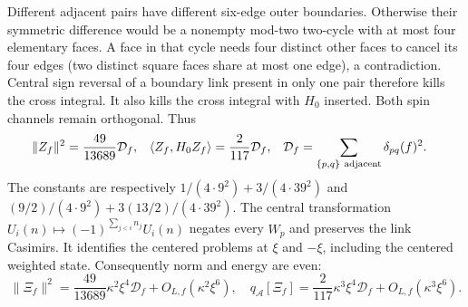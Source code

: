 \documentclass[11pt]{article}
\begin{document}
Different adjacent pairs have different six-edge outer boundaries.
Otherwise their symmetric difference would be a nonempty mod-two
two-cycle with at most four elementary faces. A face in that cycle
needs four distinct other faces to cancel its four edges (two distinct
square faces share at most one edge), a contradiction.
Central sign reversal of a boundary link present in only one pair
therefore kills the cross integral. It also kills the cross integral
with $H_0$ inserted. Both spin channels remain orthogonal. Thus
\begin{align}
 \|Z_f\|^2&=\frac{49}{13689}\mathcal D_f,&
 \langle Z_f,H_0Z_f\rangle&=\frac2{117}\mathcal D_f,&
 \mathcal D_f&=\sum_{\{p,q\}\ {\rm adjacent}}\delta_{pq}(f)^2 .
 \label{eq:fabel-D-moments}
\end{align}
The constants are respectively $1/(4\cdot9^2)+3/(4\cdot39^2)$ and
$(9/2)/(4\cdot9^2)+3(13/2)/(4\cdot39^2)$.
The central transformation
$U_i(n)\mapsto(-1)^{\sum_{j<i}n_j}U_i(n)$ negates every $W_p$ and
preserves the link Casimirs. It identifies the centered problems at
$\xi$ and $-\xi$, including the centered weighted state.
Consequently norm and energy are even:
\begin{equation}\label{eq:fabel-first-moments}
 \|\Xi_f\|^2=\frac{49}{13689}\kappa^2\xi^4\mathcal D_f+
 O_{L,f}(\kappa^2\xi^6),\quad
 q_{\mathcal A}[\Xi_f]=\frac2{117}\kappa^3\xi^4\mathcal D_f+
 O_{L,f}(\kappa^3\xi^6).
\end{equation}
\end{document}
